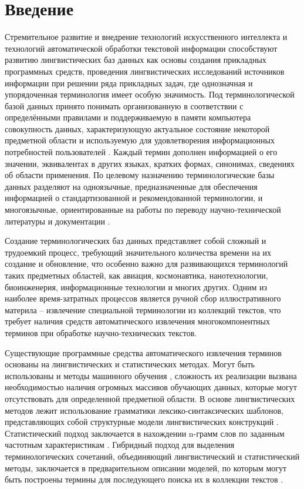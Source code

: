 \section*{Введение}

Стремительное развитие и внедрение технологий искусственного интеллекта и технологий автоматической обработки текстовой информации способствуют развитию лингвистических баз данных как основы создания прикладных программных средств, проведения лингвистических исследований источников информации при решении ряда прикладных задач, где однозначная и упорядоченная терминология имеет особую значимость. Под терминологической базой данных принято понимать организованную в соответствии с определёнными правилами и поддерживаемую в памяти компьютера совокупность данных, характеризующую актуальное состояние некоторой предметной области и используемую для удовлетворения информационных потребностей пользователей \cite{intro_1}. Каждый термин дополнен информацией о его значении, эквивалентах в других языках, кратких формах, синонимах, сведениях об области применения. По целевому назначению терминологические базы данных разделяют на одноязычные, предназначенные для обеспечения информацией о стандартизованной и рекомендованной терминологии, и многоязычные, ориентированные на работы по переводу научно-технической литературы и документации \cite{intro_2} \cite{intro_3}.

Создание терминологических баз данных представляет собой сложный и трудоемкий процесс, требующий значительного количества времени на их создание и обновление, что особенно важно для развивающихся терминологий таких предметных областей, как авиация, космонавтика, нанотехнологии, биоинженерия, информационные технологии и многих других. Одним из наиболее время-затратных процессов является ручной сбор иллюстративного материла -- извлечение специальной терминологии из коллекций текстов, что требует наличия средств автоматического извлечения многокомпонентных терминов при обработке научно-технических текстов.

Существующие программные средства автоматического извлечения терминов основаны на лингвистических и статистических методах. Могут быть использованы и методы машинного обучения \cite{intro_4}, сложность их реализации вызвана необходимостью наличия огромных массивов обучающих данных, которые могут отсутствовать для определенной предметной области. В основе лингвистических методов лежит использование грамматики лексико-синтаксических шаблонов, представляющих собой структурные модели лингвистических конструкций \cite{intro_5} \cite{intro_6}. Статистический подход заключается в нахождении n-грамм слов по заданным частотным характеристикам \cite{intro_7} \cite{intro_8}. Гибридный подход для выделения терминологических сочетаний, объединяющий лингвистический и статистический методы, заключается в предварительном описании моделей, по которым могут быть построены термины для последующего поиска их в коллекции текстов \cite{intro_9}.

